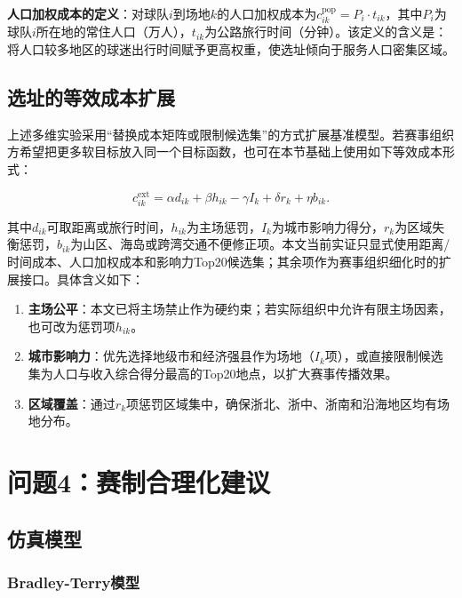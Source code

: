 \documentclass[12pt,a4paper]{article}
\begin{document}
\textbf{人口加权成本的定义}：对球队$i$到场地$k$的人口加权成本为$c_{ik}^{\text{pop}} = P_i \cdot t_{ik}$，其中$P_i$为球队$i$所在地的常住人口（万人），$t_{ik}$为公路旅行时间（分钟）。该定义的含义是：将人口较多地区的球迷出行时间赋予更高权重，使选址倾向于服务人口密集区域。

\subsection{选址的等效成本扩展}

上述多维实验采用“替换成本矩阵或限制候选集”的方式扩展基准模型。若赛事组织方希望把更多软目标放入同一个目标函数，也可在本节基础上使用如下等效成本形式：

\begin{equation}
  c_{ik}^{\mathrm{ext}}
  = \alpha d_{ik} + \beta h_{ik} - \gamma I_k + \delta r_k + \eta b_{ik}.
\end{equation}

其中$d_{ik}$可取距离或旅行时间，$h_{ik}$为主场惩罚，$I_k$为城市影响力得分，$r_k$为区域失衡惩罚，$b_{ik}$为山区、海岛或跨湾交通不便修正项。本文当前实证只显式使用距离/时间成本、人口加权成本和影响力Top20候选集；其余项作为赛事组织细化时的扩展接口。具体含义如下：

\begin{enumerate}[(1)]
  \item \textbf{主场公平}：本文已将主场禁止作为硬约束；若实际组织中允许有限主场因素，也可改为惩罚项$h_{ik}$。
  \item \textbf{城市影响力}：优先选择地级市和经济强县作为场地（$I_k$项），或直接限制候选集为人口与收入综合得分最高的Top20地点，以扩大赛事传播效果。
  \item \textbf{区域覆盖}：通过$r_k$项惩罚区域集中，确保浙北、浙中、浙南和沿海地区均有场地分布。
\end{enumerate}

\section{问题4：赛制合理化建议}

\subsection{仿真模型}

\subsubsection{Bradley-Terry模型}
\end{document}
